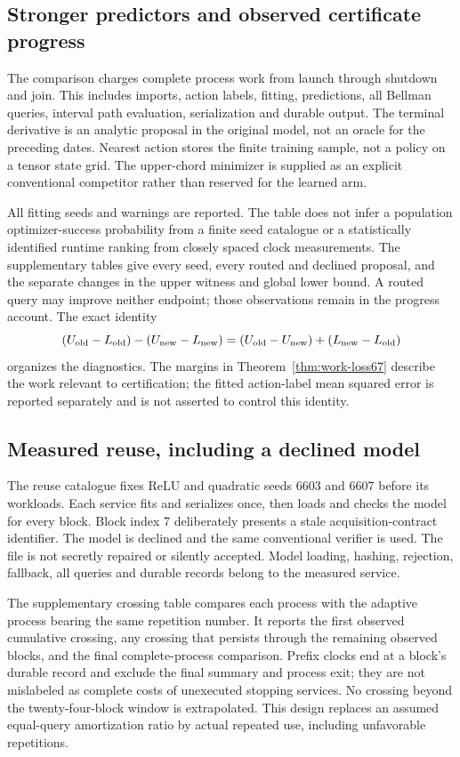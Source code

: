 \subsection{Stronger predictors and observed certificate progress}

The comparison charges complete process work from launch through shutdown and join. This includes imports, action labels, fitting, predictions, all Bellman queries, interval path evaluation, serialization and durable output. The terminal derivative is an analytic proposal in the original model, not an oracle for the preceding dates. Nearest action stores the finite training sample, not a policy on a tensor state grid. The upper-chord minimizer is supplied as an explicit conventional competitor rather than reserved for the learned arm.

All fitting seeds and warnings are reported. The table does not infer a population optimizer-success probability from a finite seed catalogue or a statistically identified runtime ranking from closely spaced clock measurements. The supplementary tables give every seed, every routed and declined proposal, and the separate changes in the upper witness and global lower bound. A routed query may improve neither endpoint; those observations remain in the progress account. The exact identity
\[
 (U_{\rm old}-L_{\rm old})-(U_{\rm new}-L_{\rm new})
 =(U_{\rm old}-U_{\rm new})+(L_{\rm new}-L_{\rm old})
\]
organizes the diagnostics. The margins in Theorem~\ref{thm:work-loss67} describe the work relevant to certification; the fitted action-label mean squared error is reported separately and is not asserted to control this identity.

\subsection{Measured reuse, including a declined model}

The reuse catalogue fixes ReLU and quadratic seeds 6603 and 6607 before its workloads. Each service fits and serializes once, then loads and checks the model for every block. Block index 7 deliberately presents a stale acquisition-contract identifier. The model is declined and the same conventional verifier is used. The file is not secretly repaired or silently accepted. Model loading, hashing, rejection, fallback, all queries and durable records belong to the measured service.

The supplementary crossing table compares each process with the adaptive process bearing the same repetition number. It reports the first observed cumulative crossing, any crossing that persists through the remaining observed blocks, and the final complete-process comparison. Prefix clocks end at a block's durable record and exclude the final summary and process exit; they are not mislabeled as complete costs of unexecuted stopping services. No crossing beyond the twenty-four-block window is extrapolated. This design replaces an assumed equal-query amortization ratio by actual repeated use, including unfavorable repetitions.

